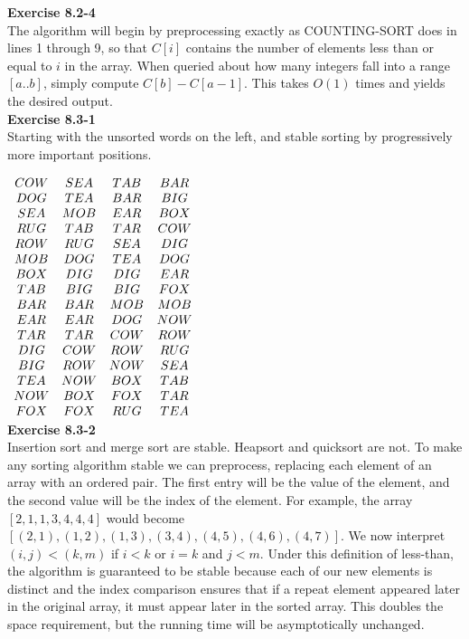 \documentclass{article}
\begin{document}
\noindent\textbf{Exercise 8.2-4}\\

The algorithm will begin by preprocessing exactly as COUNTING-SORT does in lines 1 through 9, so that $C[i]$ contains the number of elements less than or equal to $i$ in the array. When queried about how many integers fall into a range $[a..b]$, simply compute $C[b] - C[a-1]$.  This takes $O(1)$ times and yields the desired output.\\

\noindent\textbf{Exercise 8.3-1}\\

Starting with the unsorted words on the left, and stable sorting by progressively more important positions.

$
\begin{array}{c  c  c  c}
COW&SEA&TAB&BAR\\
DOG&TEA&BAR&BIG\\
SEA&MOB&EAR&BOX\\
RUG&TAB&TAR&COW\\
ROW&RUG&SEA&DIG\\
MOB&DOG&TEA&DOG\\
BOX&DIG&DIG&EAR\\
TAB&BIG&BIG&FOX\\
BAR&BAR&MOB&MOB\\
EAR&EAR&DOG&NOW\\
TAR&TAR&COW&ROW\\
DIG&COW&ROW&RUG\\
BIG&ROW&NOW&SEA\\
TEA&NOW&BOX&TAB\\
NOW&BOX&FOX&TAR\\
FOX&FOX&RUG&TEA\\
\end{array}
$\\

\noindent\textbf{Exercise 8.3-2}\\

Insertion sort and merge sort are stable.  Heapsort and quicksort are not. To make any sorting algorithm stable we can preprocess, replacing each element of an array with an ordered pair.  The first entry will be the value of the element, and the second value will be the index of the element.  For example, the array $[2, 1, 1, 3, 4, 4, 4]$ would become $[(2,1), (1,2), (1,3), (3,4), (4,5), (4,6), (4,7)]$.  We now interpret $(i,j) < (k,m)$ if $i < k$ or $i=k$ and $j<m$.  Under this definition of less-than, the algorithm is guaranteed to be stable because each of our new elements is distinct and the index comparison ensures that if a repeat element appeared later in the original array, it must appear later in the sorted array. This doubles the space requirement, but the running time will be asymptotically unchanged.\\
\end{document}
